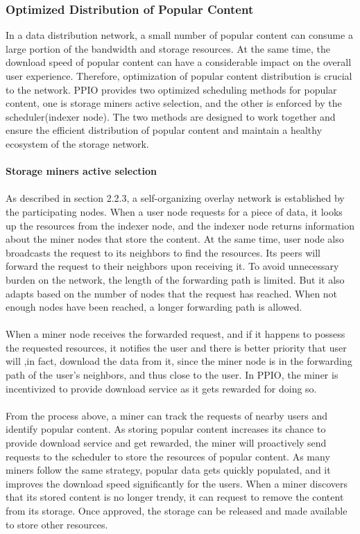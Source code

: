 \documentclass[10pt,a4paper]{article}
\begin{document}
         \subsubsection{Optimized Distribution of Popular Content}  %
In a data distribution network, a small number of popular content can consume a large portion of the bandwidth and storage resources. At the same time, the download speed of popular content can have a considerable impact on the overall user experience. Therefore, optimization of popular content distribution is crucial to the network. PPIO provides two optimized scheduling methods for popular content, one is storage miners active selection, and the other is enforced by the scheduler(indexer node). The two methods are designed to work together and ensure the efficient distribution of popular content and maintain a healthy ecosystem of the storage network.
\vspace{-0.5em}
\\ \\{\bf Storage miners active selection}
\vspace{-0.5em}
\\ \\As described in section 2.2.3, a self-organizing overlay network is established by the participating nodes. When a user node requests for a piece of data, it looks up the resources from the indexer node, and the indexer node returns information about the miner nodes that store the content. At the same time, user node also broadcasts the request to its neighbors to find the resources. Its peers will forward the request to their neighbors upon receiving it. To avoid unnecessary burden on the network, the length of the forwarding path is limited. But it also adapts based on the number of nodes that the request has reached. When not enough nodes have been reached, a longer forwarding path is allowed.
\vspace{-0.5em}
\\ \\When a miner node receives the forwarded request, and if it happens to possess the requested resources, it notifies the user and there is better priority that user will ,in fact, download the data from it, since the miner node is in the forwarding path of the user’s neighbors, and thus close to the user. In PPIO, the miner is incentivized to provide download service as it gets rewarded for doing so.  
\vspace{-0.5em}
\\ \\From the process above, a miner can track the requests of nearby users and identify popular content. As storing popular content increases its chance to provide download service and get rewarded, the miner will proactively send requests to the scheduler to store the resources of popular content. As many miners follow the same strategy, popular data gets quickly populated, and it improves the download speed significantly for the users. When a miner discovers that its stored content is no longer trendy, it can request to remove the content from its storage. Once approved, the storage can be released and made available to store other resources.
\end{document}
